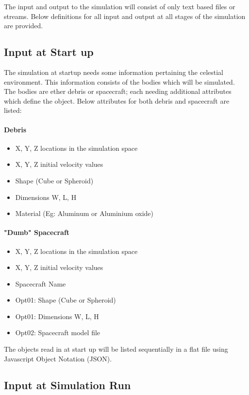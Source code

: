 \documentclass{article}
\begin{document}
The input and output to the simulation will consist of only text based files or streams. Below definitions for all input and output at all stages of the simulation are provided. 
  
  \subsection{Input at Start up}
  
  The simulation at startup needs some information pertaining the celestial environment. This information consists of the bodies which will be simulated. The bodies are ether debris or spacecraft; each needing additional attributes which define the object. Below attributes for both debris and spacecraft are listed:
  
  \paragraph{Debris}
  \begin{itemize}
  	\item X, Y, Z locations in the simulation space
  	\item X, Y, Z initial velocity values
  	\item Shape (Cube or Spheroid)
  	\item Dimensions W, L, H
  	\item Material (Eg: Aluminum or Aluminium oxide)
  \end{itemize}
  
  \paragraph{"Dumb" Spacecraft}
  \begin{itemize}
  	\item X, Y, Z locations in the simulation space
  	\item X, Y, Z initial velocity values
  	\item Spacecraft Name
  	\item Opt01: Shape (Cube or Spheroid)
  	\item Opt01: Dimensions W, L, H
  	\item Opt02: Spacecraft model file
  \end{itemize}
  
  The objects read in at start up will be listed sequentially in a flat file using Javascript Object Notation (JSON).
  
  \subsection{Input at Simulation Run}
  
\end{document}
